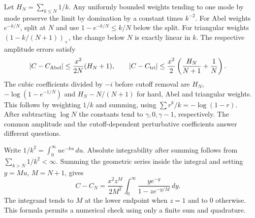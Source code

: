 Let $H_N=\sum_{k\le N}1/k$. Any uniformly bounded weights tending to one mode by mode preserve the limit by domination by a constant times $k^{-2}$. For Abel weights $e^{-k/N}$, split at $N$ and use $1-e^{-k/N}\le k/N$ below the split. For triangular weights $(1-k/(N+1))_+$, the change below $N$ is exactly linear in $k$. The respective amplitude errors satisfy
\[
 |C-C_{\rm Abel}|\le\frac{x^2}{2N}(H_N+1),\qquad
 |C-C_{\rm tri}|\le\frac{x^2}{2}\left(\frac{H_N}{N+1}+\frac1N\right).
\]
The cubic coefficients divided by $-i$ before cutoff removal are $H_N$, $-\log(1-e^{-1/N})$ and $H_N-N/(N+1)$ for hard, Abel and triangular weights. This follows by weighting $1/k$ and summing, using $\sum r^k/k=-\log(1-r)$. After subtracting $\log N$ the constants tend to $\gamma,0,\gamma-1$, respectively. The common amplitude and the cutoff-dependent perturbative coefficients answer different questions.

Write $1/k^2=\int_0^\infty u e^{-ku}\,du$. Absolute integrability after summing follows from $\sum_{k>N}1/k^2<\infty$. Summing the geometric series inside the integral and setting $y=Mu$, $M=N+1$, gives
\[
 C-C_N=\frac{x^2z^M}{2M^2}\int_0^\infty
              \frac{y e^{-y}}{1-z e^{-y/M}}\,dy .
\]
The integrand tends to $M$ at the lower endpoint when $z=1$ and to $0$ otherwise. This formula permits a numerical check using only a finite sum and quadrature.

